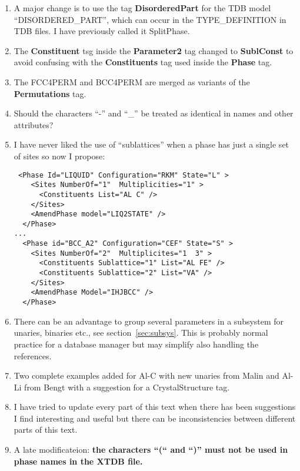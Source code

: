 \documentclass{article}
\begin{document}
\begin{enumerate}
\item A major change is to use the tag {\bf DisorderedPart} for the
  TDB model ``DISORDERED\_PART'', which can occur in the
  TYPE\_DEFINITION in TDB files.  I have previously called it
  SplitPhase.

\item The {\bf Constituent} tsg inside the {\bf Parameter2} tag
  changed to {\bf SublConst} to avoid confusing with the
  {\bf Constituents} tag used inside the {\bf Phase} tag.

\item The FCC4PERM and BCC4PERM are merged as variants of the
  {\bf Permutations} tag.
  
\item Should the characters ``-'' and ``\_'' be treated as identical
  in names and other attributes?

\item I have never liked the use of ``sublattices'' when a phase has
  just a single set of sites so now I propose:

{\small
\begin{verbatim}
 <Phase Id="LIQUID" Configuration="RKM" State="L" >
    <Sites NumberOf="1"  Multiplicities="1" >
      <Constituents List="AL C" />
    </Sites>
    <AmendPhase model="LIQ2STATE" />
  </Phase>
...
  <Phase id="BCC_A2" Configuration="CEF" State="S" >
    <Sites NumberOf="2"  Multiplicites="1  3" >
      <Constituents Sublattice="1" List="AL FE" />
      <Constituents Sublattice="2" List="VA" />
    </Sites>
    <AmendPhase Model="IHJBCC" />
  </Phase>
\end{verbatim}
}

\item There can be an advantage to group several parameters in a
  subsystem for unaries, binaries etc., see section~\ref{sec:subsys}.
  This is probably normal practice for a database manager but may
  simplify also handling the references.

\item Two complete examples added for Al-C with new unaries from Malin
  and Al-Li from Bengt with a suggestion for a CrystalStructure tag.

\item I have tried to update every part of this text when there has
  been suggestions I find interesting and useful but there can be
  inconsistencies between different parts of this text.

\item A late modificateion: {\bf the characters ``(`` and ``)'' must
  not be used in phase names in the XTDB file.}

\end{enumerate}
\end{document}
